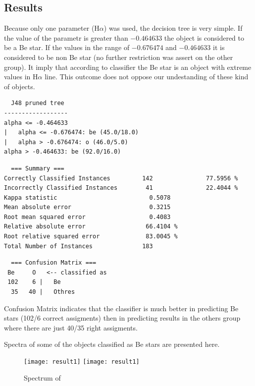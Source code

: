 \subsection{Results}

Because only one parameter (H$\alpha$) was used, the decision tree is
very simple. If the value of the parametr is greater than $-0.464633$
the object is considered to be a Be star. If the values in the range
of $-0.676474$ and $-0.464633$ it is considered to be non Be star (no
further restriction was assert on the \textrm{other} group). It imply
that according to classifier the Be star is an object with extreme
values in H$\alpha$ line. This outcome does not oppose our
undestanding of these kind of objects.


\begin{lstlisting}
  J48 pruned tree
------------------
alpha <= -0.464633
|   alpha <= -0.676474: be (45.0/18.0)
|   alpha > -0.676474: o (46.0/5.0)
alpha > -0.464633: be (92.0/16.0)
\end{lstlisting}

\begin{lstlisting}
  === Summary ===
Correctly Classified Instances         142               77.5956 %
Incorrectly Classified Instances        41               22.4044 %
Kappa statistic                          0.5078
Mean absolute error                      0.3215
Root mean squared error                  0.4083
Relative absolute error                 66.4104 %
Root relative squared error             83.0045 %
Total Number of Instances              183     
\end{lstlisting}

\begin{lstlisting}
  === Confusion Matrix ===
 Be     O   <-- classified as
 102    6 |   Be
  35   40 |   Othres
\end{lstlisting}

Confusion Matrix indicates that the classifier is much better in
predicting Be stars (102/6 correct assigments) then in predicting
results in the \textrm{others} group where there are just 40/35 right
assigments.

Spectra of some of the objects classified as Be stars are presented
here. 


   \begin{figure}[!htbp]
      \begin{center}
        \leavevmode
        \ifpdf
        \texttt{[image: result1]}
        \else
        \texttt{[image: result1]}
        \fi
        \caption{Spectrum of }
        \label{FigResult1}
      \end{center}
    \end{figure}

